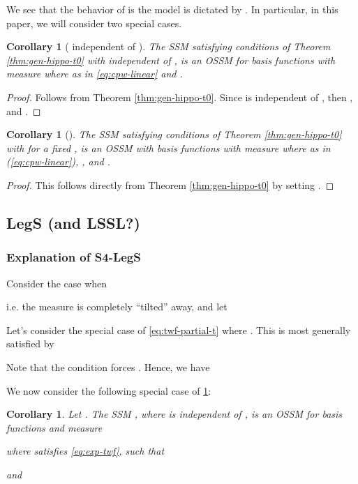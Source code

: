 \documentclass{article}
\newtheorem{corollary}[lemma]{Corollary}
\begin{document}
We see that the behavior of is the model is dictated by . In particular, in this paper, we will consider two special cases.




\begin{corollary}[ independent of ]
The SSM   satisfying conditions of Theorem \ref{thm:gen-hippo-t0} with  independent of ,  is an OSSM for basis functions  with measure  where
    as in \eqref{eq:cpw-linear}
 and .

\label{cor:hippo-t0-infty}
\end{corollary}
\begin{proof}
Follows from Theorem \ref{thm:gen-hippo-t0}. Since
  is independent of , then  , and .
\end{proof}


\begin{corollary}[]
The SSM   satisfying conditions of Theorem \ref{thm:gen-hippo-t0} with   for a fixed , is an OSSM with basis functions  with measure  where  as in (\ref{eq:cpw-linear}),  , and .
\label{cor:hippo-gen-fin}
\end{corollary}
\begin{proof}
This follows directly from Theorem \ref{thm:gen-hippo-t0} by setting .
\end{proof}












\subsection{LegS (and LSSL?)}
\label{sec:proofs:legs}
\subsubsection{Explanation of S4-LegS}
Consider the case when



 i.e. the measure is completely ``tilted'' away, and let

Let's consider the special case of \eqref{eq:twf-partial-t} where . This is most generally satisfied by


Note that the condition  forces . Hence, we have


We now consider the following special case of \cref{cor:hippo-t0-infty}:


\begin{corollary}Let . The SSM , where  is independent of , is an OSSM for basis functions and measure
  
  where  satisfies \eqref{eq:exp-twf},
   such that

 and


\label{cor:exp-twf}
\end{corollary}
\end{document}
